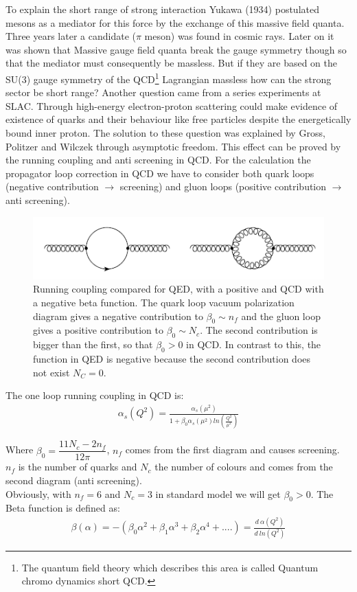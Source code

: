 To explain the short range of strong interaction Yukawa (1934) postulated mesons as a mediator for this force by the exchange of this massive field quanta. Three years later a candidate ($ \pi $ meson) was found in cosmic rays. Later on it was shown that Massive gauge field quanta break the gauge symmetry though so that the mediator must consequently be massless. But if they are based on the SU(3) gauge symmetry of the QCD\footnote{The quantum field theory which describes this area is called Quantum chromo dynamics short QCD.} Lagrangian massless how can the strong sector be short range? Another question came from a series experiments at SLAC. Through high-energy electron-proton scattering could make evidence of existence of quarks and their behaviour like free particles despite the energetically bound inner proton. The solution to these question was explained by Gross, Politzer
and Wilczek through asymptotic freedom. 
This effect can be proved by the running coupling and anti screening in QCD.
For the calculation the propagator loop correction in QCD we have to consider both quark loops (negative contribution $ \rightarrow $ screening) and gluon loops (positive contribution $ \rightarrow $ anti screening). 
\begin{figure}[h!]
\centering
\includegraphics[scale=0.7]{images/Intro/quarkGluonPop.png}
\caption{Running coupling compared for QED, with a positive and QCD with a negative beta function. The quark loop vacuum polarization diagram gives a negative contribution
to $\beta_0 \sim n_f$ and the gluon loop gives a positive contribution to $\beta_0 \sim N_c$. The second contribution is bigger than the first, so that $ \beta_0 > 0 $ in QCD. In contrast to this, the function in QED is negative because the second contribution does not exist $ N_C=0 $.}
\end{figure}

The one loop running coupling in QCD is:
\begin{equation}
\begin{split}
\alpha_s(Q^2)= \frac{\alpha_s(\mu^2)}{1+\beta_0 \alpha_s(\mu^2) ln(\frac{Q^2}{\mu^2})}
\end{split}
\end{equation}

Where $ \beta_0 = \dfrac{11N_c -2n_f}{12\pi} $, $ n_f $ comes from the first diagram and causes screening.  $ n_f $ is the number of quarks and $ N_c $ the number of colours and comes from the second diagram (anti screening). \\
Obviously, with $ n_f = 6 $ and $ N_c = 3 $ in standard model we will get $ \beta_0 >0 $. The Beta function is defined as:
\begin{equation}
\begin{split}
\beta(\alpha)=-(\beta_0 \alpha^2 + \beta_1 \alpha^3+\beta_2\alpha^4+....)=\frac{d\:\alpha(Q^2)}{d \:ln(Q^2)}
\end{split}
\end{equation}

